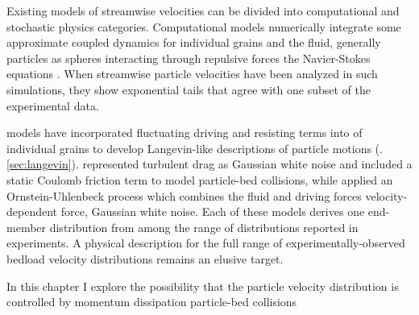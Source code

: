 Existing models of streamwise \DIFdelbegin {}\DIFdelend \DIFaddbegin {}\DIFaddend velocities can be divided into computational and stochastic physics categories.
Computational models numerically integrate some approximate coupled dynamics for individual grains and the fluid, generally \DIFdelbegin {}\DIFdelend \DIFaddbegin {}\DIFaddend particles as spheres interacting through repulsive forces \DIFdelbegin {}\DIFdelend \DIFaddbegin {}\DIFaddend the Navier-Stokes equations \DIFdelbegin {}\DIFdelend \DIFaddbegin {}\DIFaddend .
When streamwise particle velocities have been analyzed in such simulations, they show exponential tails \citep{Gonzalez2017,Furbish2013} that agree with one subset of the experimental data.

\DIFdelbegin {}\DIFdelend \DIFaddbegin {}\DIFaddend models have incorporated fluctuating driving and resisting terms into \DIFdelbegin {}\DIFdelend \DIFaddbegin {}\DIFaddend of individual grains to develop Langevin-like descriptions of \DIFdelbegin {}\DIFdelend \DIFaddbegin {}\DIFaddend particle motions (\DIFdelbegin {}\DIFdelend \DIFaddbegin {}\DIFaddend . \ref{sec:langevin}). \citet{Fan2014} represented turbulent drag as Gaussian white noise and included a static Coulomb friction term to model particle-bed collisions, while \citet{Ancey2014} applied an Ornstein-Uhlenbeck process which combines the fluid and driving forces \DIFdelbegin {}\DIFdelend \DIFaddbegin {}\DIFaddend velocity-dependent force, \DIFdelbegin {}\DIFdelend \DIFaddbegin {}\DIFaddend Gaussian white noise\DIFdelbegin {}\DIFdelend .
Each of these models derives one end-member distribution from among the range of distributions reported in experiments.
A physical description for the full range of experimentally-observed bedload velocity distributions remains an elusive target.

In this chapter I explore the possibility that the \DIFdelbegin {}\DIFdelend particle velocity distribution is controlled by momentum dissipation \DIFdelbegin {}\DIFdelend \DIFaddbegin {}\DIFaddend particle-bed collisions \DIFaddbegin {}

